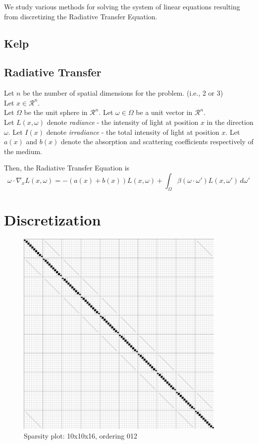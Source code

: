 \documentclass[10pt]{article}
\newcommand\RR{\mathcal{R}}
\begin{document}


We study various methods for solving the system of linear equations resulting from discretizing the Radiative Transfer Equation.
\subsection{Kelp}
\subsection{Radiative Transfer}
Let $n$ be the number of spatial dimensions for the problem. (i.e., 2 or 3) \\
Let $x \in \RR^n$. \\
Let $\Omega$ be the unit sphere in $\RR^n$.
Let $\omega \in \Omega$ be a unit vector in $\RR^n$. \\
Let $L(x,\omega)$ denote \textit{radiance} - the intensity of light at position $x$ in the direction $\omega$.
Let $I(x)$ denote \textit{irradiance} - the total intensity of light at position $x$.
Let $a(x)$ and $b(x)$ denote the absorption and scattering coefficients respectively of the medium.

Then, the Radiative Transfer Equation is
\begin{equation}
	\label{eq:rte}
	\omega \cdot \nabla_x L(x,\omega) = -(a(x) + b(x)) L(x,\omega)
	+ \int_\Omega \beta(\omega \cdot \omega') L(x,\omega')\, d\omega'
\end{equation}

\section{Discretization}
\begin{figure}[H]
	\centering
	\includegraphics[width=4in]{../img/sparsity/int_kelp1_10x10x16_012.png}
	\caption{Sparsity plot: 10x10x16, ordering 012}
\end{figure}
\end{document}
